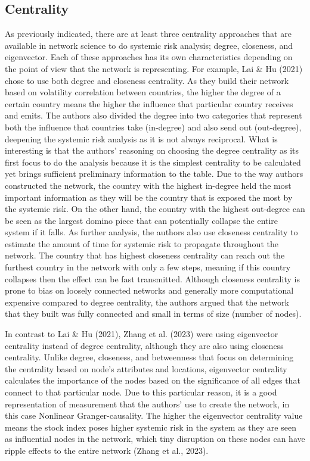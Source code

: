 \documentclass[a4paper,11pt]{article}
\begin{document}
\subsection{Centrality}
As previously indicated, there are at least three centrality approaches that are available in network science to do systemic risk analysis; degree, closeness, and eigenvector. Each of these approaches has its own characteristics depending on the point of view that the network is representing.
For example, Lai \& Hu (2021) chose to use both degree and closeness centrality. As they build their network based on volatility correlation between countries, the higher the degree of a certain country means the higher the influence that particular country receives and emits. The authors also divided the degree into two categories that represent both the influence that countries take (in-degree) and also send out (out-degree), deepening the systemic risk analysis as it is not always reciprocal. What is interesting is that the authors’ reasoning on choosing the degree centrality as its first focus to do the analysis because it is the simplest centrality to be calculated yet brings sufficient preliminary information to the table. Due to the way authors constructed the network, the country with the highest in-degree held the most important information as they will be the country that is exposed the most by the systemic risk. On the other hand, the country with the highest out-degree can be seen as the largest domino piece that can potentially collapse the entire system if it falls. As further analysis, the authors also use closeness centrality to estimate the amount of time for systemic risk to propagate throughout the network. The country that has highest closeness centrality can reach out the furthest country in the network with only a few steps, meaning if this country collapses then the effect can be fast transmitted. Although closeness centrality is prone to bias on loosely connected networks and generally more computational expensive compared to degree centrality, the authors argued that the network that they built was fully connected and small in terms of size (number of nodes). 

In contrast to Lai \& Hu (2021), Zhang et al. (2023) were using eigenvector centrality instead of degree centrality, although they are also using closeness centrality. Unlike degree, closeness, and betweenness that focus on determining the centrality based on node’s attributes and locations, eigenvector centrality calculates the importance of the nodes based on the significance of all edges that connect to that particular node. Due to this particular reason, it is a good representation of measurement that the authors’ use to create the network, in this case Nonlinear Granger-causality. The higher the eigenvector centrality value means the stock index poses higher systemic risk in the system as they are seen as influential nodes in the network, which tiny disruption on these nodes can have ripple effects to the entire network (Zhang et al., 2023). 
\end{document}
